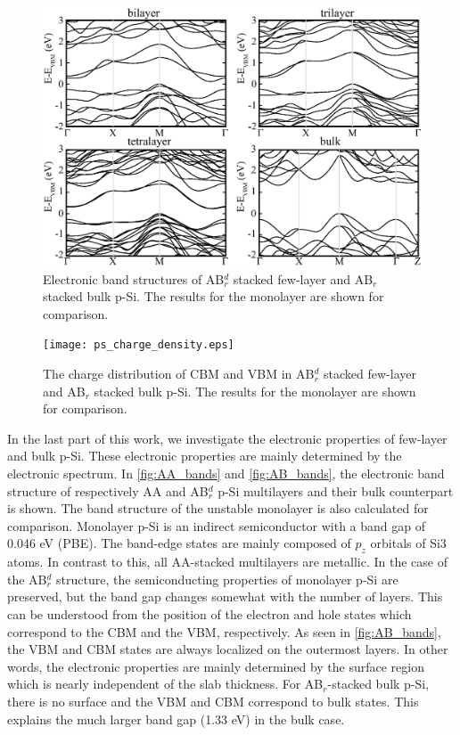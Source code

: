\begin{figure}[htb]
\centering
\includegraphics[width=0.8\linewidth]{ps_AB_bands.eps}%
\caption{Electronic band structures of AB$_r^d$ stacked few-layer and AB$_r$ stacked bulk p-Si. The results for the monolayer are shown for comparison.\label{fig:AB_bands}}
\end{figure} 

\begin{figure}[htb]
\centering
\texttt{[image: ps\_charge\_density.eps]}%
\caption{The charge distribution of CBM and VBM in AB$_r^d$ stacked few-layer and AB$_r$ stacked bulk p-Si. The results for the monolayer are shown for comparison.\label{fig:charge_density}}
\end{figure}

In the last part of this work, we investigate the electronic properties of few-layer and bulk p-Si. These electronic properties are mainly determined by the electronic spectrum. In \autoref{fig:AA_bands} and \autoref{fig:AB_bands}, the electronic band structure of respectively AA and AB$_r^d$ p-Si multilayers and their bulk counterpart is shown. The band structure of the unstable monolayer is also calculated for comparison. Monolayer p-Si is an indirect semiconductor with a band gap of 0.046 eV (PBE). The band-edge states are mainly composed of $p_z$ orbitals of Si3 atoms. In contrast to this, all AA-stacked multilayers are metallic. In the case of the AB$_r^d$ structure, the semiconducting properties of monolayer p-Si are preserved, but the band gap changes somewhat with the number of layers. This can be understood from the position of the electron and hole states which correspond to the CBM and the VBM, respectively. As seen in \autoref{fig:AB_bands}, the VBM and CBM states are always localized on the outermost layers. In other words, the electronic properties are mainly determined by the surface region which is nearly independent of the slab thickness. For AB$_r$-stacked bulk p-Si, there is no surface and the VBM and CBM correspond to bulk states. This explains the much larger band gap (1.33 eV) in the bulk case. 


